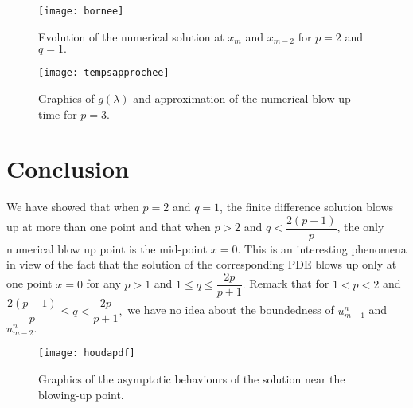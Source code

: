 \documentclass[a4paper,12pt,english,reqno]{smfart}
\begin{document}
	\begin{figure}[H]
		\begin{minipage}[b]{0.40\linewidth}
			\centering
			\texttt{[image: bornee]}
			\caption{Evolution of the numerical solution at $x_{m}$ and $x_{m-2}$ for $p=2$ and $q=1.$}
		\end{minipage}\hfill
		\begin{minipage}[b]{0.40\linewidth}
			
			
			
			\centering
			\texttt{[image: tempsapprochee]}
			\caption{Graphics of $g(\lambda)$ and approximation of the numerical blow-up time for $p=3.$}
			
			
			
			
			
		\end{minipage}
	\end{figure}
	\section{Conclusion }
	\noindent We have showed that when $p=2$ and $q=1$, the finite difference solution blows up at more than one point and that when $p>2$ and $q<\dfrac{2(p-1)}{p}$, the only numerical blow up point is the mid-point $x=0.$
	This is an interesting phenomena in view of the fact that the solution of the corresponding PDE blows up only at one point $x=0$ for any $p>1$ and $1\leq q\leq \dfrac{2p}{p+1}.$
	Remark that for $1<p<2$ and $\dfrac{2(p-1)}{p}\leq q< \dfrac{2p}{p+1},$ we have no idea about the boundedness of $u_{m-1}^{n}$ and $u_{m-2}^{n}.$
	\vspace{-2cm}
	\begin{figure}[H]
		\centering
		\texttt{[image: houdapdf]}
		\vspace{-2cm}
		\caption{Graphics of the asymptotic behaviours of the solution near the blowing-up point.}
	\end{figure}
	
\end{document}
